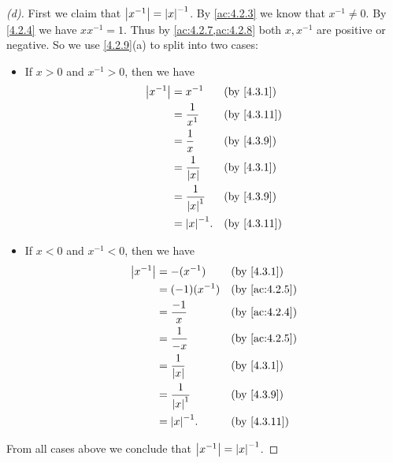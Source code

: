 \begin{proof}[(d)]
  First we claim that \(\left\lvert x^{-1}\right\rvert = \left\lvert x\right\rvert^{-1}\).
  By \cref{ac:4.2.3} we know that \(x^{-1} \neq 0\).
  By \cref{4.2.4} we have \(x x^{-1} = 1\).
  Thus by \cref{ac:4.2.7,ac:4.2.8} both \(x, x^{-1}\) are positive or negative.
  So we use \cref{4.2.9}(a) to split into two cases:
  \begin{itemize}
    \item If \(x > 0\) and \(x^{-1} > 0\), then we have
          \begin{align*}
            \abs{x^{-1}} & = x^{-1}               &  & \by{4.3.1}  \\
                         & = \dfrac{1}{x^1}       &  & \by{4.3.11} \\
                         & = \dfrac{1}{x}         &  & \by{4.3.9}  \\
                         & = \dfrac{1}{\abs{x}}   &  & \by{4.3.1}  \\
                         & = \dfrac{1}{\abs{x}^1} &  & \by{4.3.9}  \\
                         & = \abs{x}^{-1}.        &  & \by{4.3.11}
          \end{align*}
    \item If \(x < 0\) and \(x^{-1} < 0\), then we have
          \begin{align*}
            \abs{x^{-1}} & = -(x^{-1})            &  & \by{4.3.1}    \\
                         & = (-1) (x^{-1})        &  & \by{ac:4.2.5} \\
                         & = \dfrac{-1}{x}        &  & \by{ac:4.2.4} \\
                         & = \dfrac{1}{-x}        &  & \by{ac:4.2.5} \\
                         & = \dfrac{1}{\abs{x}}   &  & \by{4.3.1}    \\
                         & = \dfrac{1}{\abs{x}^1} &  & \by{4.3.9}    \\
                         & = \abs{x}^{-1}.        &  & \by{4.3.11}
          \end{align*}
  \end{itemize}
  From all cases above we conclude that \(\left\lvert x^{-1}\right\rvert = \left\lvert x\right\rvert^{-1}\).


\end{proof}
